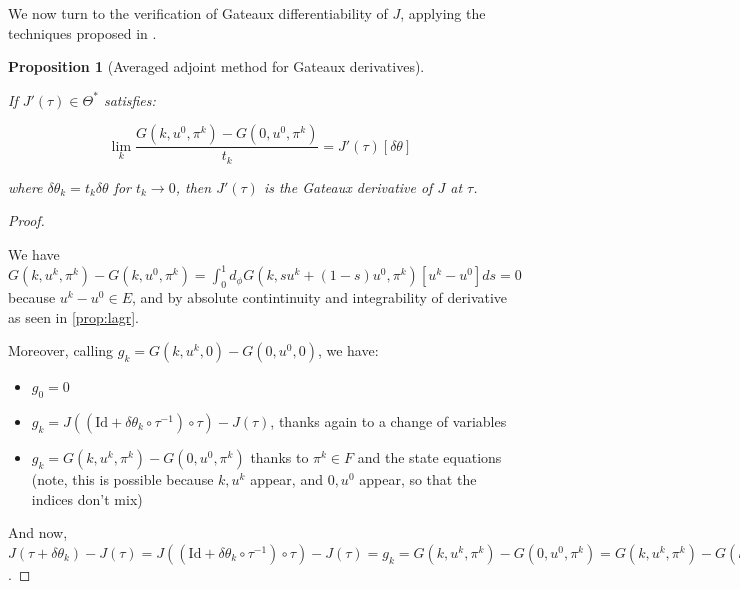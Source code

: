 \documentclass[english,a4paper,9pt,oneside]{scrbook}	%
\theoremstyle{break}
\newtheorem{prop}[equation]{Proposition}
\newenvironment{mproof}[1][\proofname]{%
  \begin{proof}[#1]$ $\par\nobreak\ignorespaces
}{%
  \end{proof}
}
\renewcommand*{\proofname}{Proof}
\theoremstyle{remark}
\newcommand{\id}{\text{Id}}
\newcommand{\te}{\theta}
\newcommand{\Te}{\Theta}
\begin{document}
We now turn to the verification of Gateaux differentiability of $J$, applying the techniques proposed in \cite{avg_adj}.

\begin{prop}[Averaged adjoint method for Gateaux derivatives]
\label{prop:adv_adj}

If $J'(\tau) \in \Te^*$ satisfies:

$$\lim_{k}\frac{G(k,u^0,\pi^k)-G(0,u^0,\pi^k)}{t_k}=J'(\tau)[\delta \te]$$

where $\delta\te_k = t_k\delta \te$ for $t_k\rightarrow 0$, then $J'(\tau)$ is the Gateaux derivative of $J$ at $\tau$.

\end{prop}

\begin{mproof}

We have $G(k,u^k,\pi^k)-G(k,u^0,\pi^k)  = \int_0^1 d_\phi G(k, su^k + (1-s)u^0,\pi^k)[u^k-u^0]ds = 0$ because $u^k-u^0 \in E$, and by absolute contintinuity and integrability of derivative as seen in \cref{prop:lagr}.

Moreover, calling $g_k = G(k,u^k,0)-G(0,u^0,0)$, we have:

\begin{itemize}
	\item $g_0 = 0$
	\item $g_k = J((\id+\delta\te_k \circ \tau^{-1})\circ \tau)-J(\tau)$, thanks again to a change of variables
	\item $g_k = G(k,u^k,\pi^k)-G(0,u^0,\pi^k)$ thanks to $\pi^k \in F$ and the state equations (note, this is possible because $k,u^k$ appear, and $0,u^0$ appear, so that the indices don't mix)
\end{itemize}

And now, $J(\tau+\delta\te_k)-J(\tau) = J((\id+\delta\te_k \circ \tau^{-1})\circ \tau)-J(\tau) = g_k = G(k,u^k,\pi^k)-G(0,u^0,\pi^k) = G(k,u^k,\pi^k)-G(k,u^0,\pi^k)+G(k,u^0,\pi^k)-G(0,u^0,\pi^k) = G(k,u^0,\pi^k)-G(0,u^0,\pi^k)$.

\end{mproof}
\end{document}
